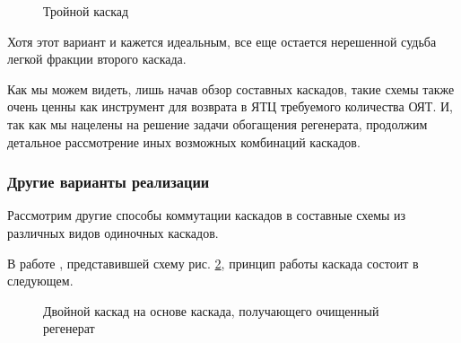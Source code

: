 \begin{figure}[ht]
  \caption{Тройной каскад}\label{fig:triple}
\end{figure}

Хотя этот вариант и кажется идеальным, все еще остается нерешенной судьба легкой фракции второго каскада.

Как мы можем видеть, лишь начав обзор составных каскадов, такие схемы также очень ценны как инструмент для возврата в ЯТЦ требуемого количества ОЯТ.
И, так как мы нацелены на решение задачи обогащения регенерата, продолжим детальное рассмотрение иных возможных комбинаций каскадов.

\subsubsection{Другие варианты реализации}
Рассмотрим другие способы коммутации каскадов в составные схемы из различных видов одиночных каскадов.

В работе \cite{palkinPurificationReprocessedUranium2016}, представившей схему рис. \ref{fig:int_double}, принцип работы каскада состоит в следующем.

\begin{figure}[ht]
  \caption{Двойной каскад на основе каскада, получающего очищенный регенерат}\label{fig:int_double}
\end{figure}

